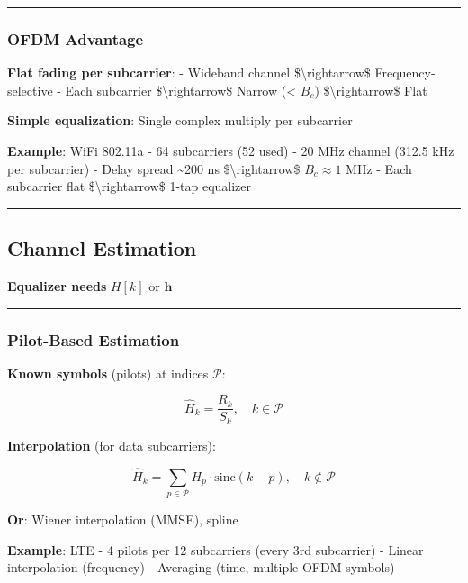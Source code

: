 \begin{center}\rule{0.5\linewidth}{0.5pt}\end{center}

\subsubsection{OFDM Advantage}\label{ofdm-advantage}

\textbf{Flat fading per subcarrier}: - Wideband channel
\$\textbackslash rightarrow\$ Frequency-selective - Each subcarrier
\$\textbackslash rightarrow\$ Narrow (\textless{} \(B_c\))
\$\textbackslash rightarrow\$ Flat

\textbf{Simple equalization}: Single complex multiply per subcarrier

\textbf{Example}: WiFi 802.11a - 64 subcarriers (52 used) - 20 MHz
channel (312.5 kHz per subcarrier) - Delay spread \textasciitilde200 ns
\$\textbackslash rightarrow\$ \(B_c \approx 1\) MHz - Each subcarrier
flat \$\textbackslash rightarrow\$ 1-tap equalizer

\begin{center}\rule{0.5\linewidth}{0.5pt}\end{center}

\subsection{Channel Estimation}\label{channel-estimation}

\textbf{Equalizer needs} \(H[k]\) or \(\mathbf{h}\)

\begin{center}\rule{0.5\linewidth}{0.5pt}\end{center}

\subsubsection{Pilot-Based Estimation}\label{pilot-based-estimation}

\textbf{Known symbols} (pilots) at indices \(\mathcal{P}\):

\[
\hat{H}_k = \frac{R_k}{S_k}, \quad k \in \mathcal{P}
\]

\textbf{Interpolation} (for data subcarriers):

\[
\hat{H}_k = \sum_{p \in \mathcal{P}} H_p \cdot \text{sinc}(k - p), \quad k \notin \mathcal{P}
\]

\textbf{Or}: Wiener interpolation (MMSE), spline

\textbf{Example}: LTE - 4 pilots per 12 subcarriers (every 3rd
subcarrier) - Linear interpolation (frequency) - Averaging (time,
multiple OFDM symbols)


